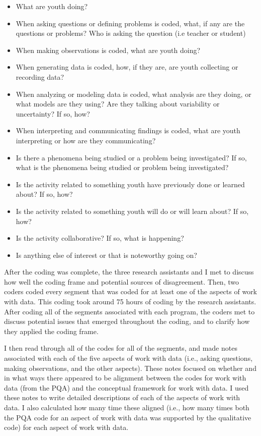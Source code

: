 \documentclass[]{msu-thesis}
\providecommand{\tightlist}{%
  \setlength{\itemsep}{0pt}\setlength{\parskip}{0pt}}
\theoremstyle{definition}
\theoremstyle{definition}
\theoremstyle{definition}
\theoremstyle{remark}
\begin{document}
\begin{itemize}
\tightlist
\item
  What are youth doing?
\item
  When asking questions or defining problems is coded, what, if any are
  the questions or problems? Who is asking the question (i.e teacher or
  student)
\item
  When making observations is coded, what are youth doing?
\item
  When generating data is coded, how, if they are, are youth collecting
  or recording data?
\item
  When analyzing or modeling data is coded, what analysis are they
  doing, or what models are they using? Are they talking about
  variability or uncertainty? If so, how?
\item
  When interpreting and communicating findings is coded, what are youth
  interpreting or how are they communicating?
\item
  Is there a phenomena being studied or a problem being investigated? If
  so, what is the phenomena being studied or problem being investigated?
\item
  Is the activity related to something youth have previously done or
  learned about? If so, how?
\item
  Is the activity related to something youth will do or will learn
  about? If so, how?
\item
  Is the activity collaborative? If so, what is happening?
\item
  Is anything else of interest or that is noteworthy going on?
\end{itemize}

After the coding was complete, the three research assistants and I met
to discuss how well the coding frame and potential sources of
disagreement. Then, two coders coded every segment that was coded for at
least one of the aspects of work with data. This coding took around 75
hours of coding by the research assistants. After coding all of the
segments associated with each program, the coders met to discuss
potential issues that emerged throughout the coding, and to clarify how
they applied the coding frame.

I then read through all of the codes for all of the segments, and made
notes associated with each of the five aspects of work with data (i.e.,
asking questions, making observations, and the other aspects). These
notes focused on whether and in what ways there appeared to be alignment
between the codes for work with data (from the PQA) and the conceptual
framework for work with data. I used these notes to write detailed
descriptions of each of the aspects of work with data. I also calculated
how many time these aligned (i.e., how many times both the PQA code for
an aspect of work with data was supported by the qualitative code) for
each aspect of work with data.
\end{document}
